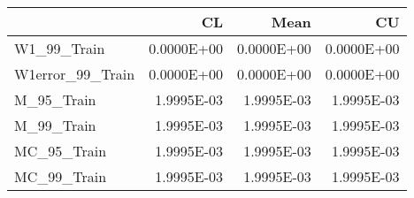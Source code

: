 \begin{tabular}{lrrr}
\toprule
{} &         CL &       Mean &         CU \\
\midrule
W1\_99\_Train      & 0.0000E+00 & 0.0000E+00 & 0.0000E+00 \\
W1error\_99\_Train & 0.0000E+00 & 0.0000E+00 & 0.0000E+00 \\
M\_95\_Train       & 1.9995E-03 & 1.9995E-03 & 1.9995E-03 \\
M\_99\_Train       & 1.9995E-03 & 1.9995E-03 & 1.9995E-03 \\
MC\_95\_Train      & 1.9995E-03 & 1.9995E-03 & 1.9995E-03 \\
MC\_99\_Train      & 1.9995E-03 & 1.9995E-03 & 1.9995E-03 \\
\bottomrule
\end{tabular}
